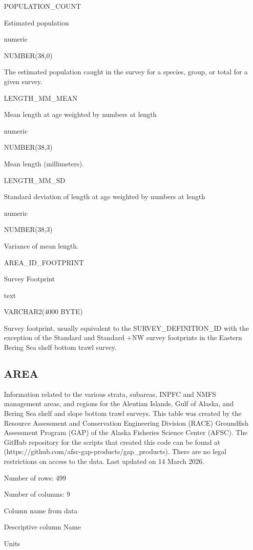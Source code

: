 \documentclass[
  letterpaper,
  oneside,
  open=any]{scrbook}
\begin{document}
POPULATION\_COUNT

Estimated population

numeric

NUMBER(38,0)

The estimated population caught in the survey for a species, group, or
total for a given survey.

LENGTH\_MM\_MEAN

Mean length at age weighted by numbers at length

numeric

NUMBER(38,3)

Mean length (millimeters).

LENGTH\_MM\_SD

Standard deviation of length at age weighted by numbers at length

numeric

NUMBER(38,3)

Variance of mean length.

AREA\_ID\_FOOTPRINT

Survey Footprint

text

VARCHAR2(4000 BYTE)

Survey footprint, usually equivalent to the SURVEY\_DEFINITION\_ID with
the exception of the Standard and Standard +NW survey footprints in the
Eastern Bering Sea shelf bottom trawl survey.

\subsection{AREA}\label{area}

Information related to the various strata, subareas, INPFC and NMFS
management areas, and regions for the Aleutian Islands, Gulf of Alaska,
and Bering Sea shelf and slope bottom trawl surveys. This table was
created by the Resource Assessment and Conservation Engineering Division
(RACE) Groundfish Assessment Program (GAP) of the Alaska Fisheries
Science Center (AFSC). The GitHub repository for the scripts that
created this code can be found at
(https://github.com/afsc-gap-products/gap\_products). There are no legal
restrictions on access to the data. Last updated on 14 March 2026.

Number of rows: 499

Number of columns: 9

Column name from data

Descriptive column Name

Units
\end{document}

